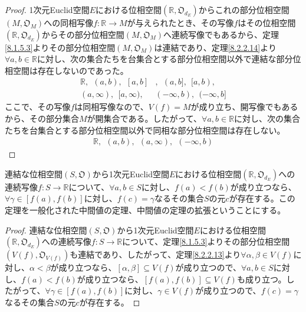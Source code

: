 \documentclass[dvipdfmx]{jsarticle}
\begin{document}
\begin{proof}
1次元Euclid空間$E$における位相空間$\left( \mathbb{R},\mathfrak{O}_{d_{E}} \right)$からこれの部分位相空間$\left( M,\mathfrak{O}_{M} \right)$への同相写像$f:\mathbb{R} \rightarrow M$が与えられたとき、その写像$f$はその位相空間$\left( \mathbb{R},\mathfrak{O}_{d_{E}} \right)$からその部分位相空間$\left( M,\mathfrak{O}_{M} \right)$へ連続写像でもあるから、定理\ref{8.1.5.3}よりその部分位相空間$\left( M,\mathfrak{O}_{M} \right)$は連結であり、定理\ref{8.2.2.14}より$\forall a,b \in \mathbb{R}$に対し、次の集合たちを台集合とする部分位相空間以外で連結な部分位相空間は存在しないのであった。
\begin{align*}
\mathbb{R},\ \ (a,b),\ \ [ a,b]&,\ \ (a,b],\ \ [ a,b),\\ 
(a,\infty),\ \ [ a,\infty),\ \ &( - \infty,b),\ \ ( - \infty,b]
\end{align*}
ここで、その写像$f$は同相写像なので、$V(f) = M$が成り立ち、開写像でもあるから、その部分集合$M$が開集合である。したがって、$\forall a,b \in \mathbb{R}$に対し、次の集合たちを台集合とする部分位相空間以外で同相な部分位相空間は存在しない。
\begin{align*}
\mathbb{R},\ \ (a,b),\ \ (a,\infty),\ \ ( - \infty,b)
\end{align*}
\end{proof}
\begin{thm}[中間値の定理の拡張]\label{8.2.2.16}
連結な位相空間$\left( S,\mathfrak{O} \right)$から1次元Euclid空間$E$における位相空間$\left( \mathbb{R},\mathfrak{O}_{d_{E}} \right)$への連続写像$f:S \rightarrow \mathbb{R}$について、$\forall a,b \in S$に対し、$f(a) < f(b)$が成り立つなら、$\forall\gamma \in \left[ f(a),f(b) \right]$に対し、$f(c) = \gamma$なるその集合$S$の元$c$が存在する。この定理を一般化された中間値の定理、中間値の定理の拡張ということにする。
\end{thm}
\begin{proof}
連結な位相空間$\left( S,\mathfrak{O} \right)$から1次元Euclid空間$E$における位相空間$\left( \mathbb{R},\mathfrak{O}_{d_{E}} \right)$への連続写像$f:S \rightarrow \mathbb{R}$について、定理\ref{8.1.5.3}よりその部分位相空間$\left( V(f),\mathfrak{O}_{V(f)} \right)$も連結であり、したがって、定理\ref{8.2.2.13}より$\forall\alpha,\beta \in V(f)$に対し、$\alpha < \beta$が成り立つなら、$[\alpha,\beta] \subseteq V(f)$が成り立つので、$\forall a,b \in S$に対し、$f(a) < f(b)$が成り立つなら、$\left[ f(a),f(b) \right] \subseteq V(f)$も成り立つ。したがって、$\forall\gamma \in \left[ f(a),f(b) \right]$に対し、$\gamma \in V(f)$が成り立つので、$f(c) = \gamma$なるその集合$S$の元$c$が存在する。
\end{proof}
\end{document}

